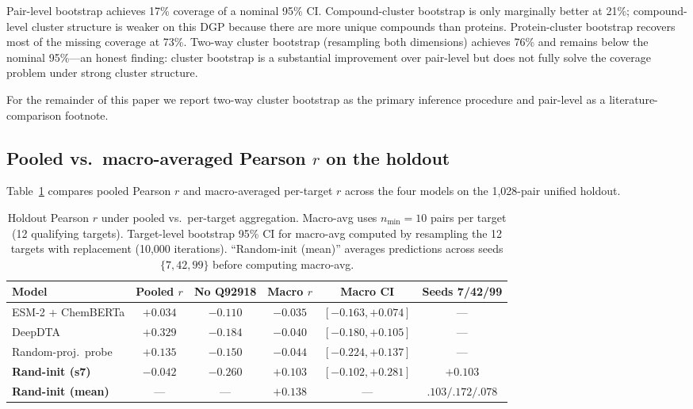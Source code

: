 \documentclass[11pt,a4paper]{article}
\begin{document}
Pair-level bootstrap achieves 17\% coverage of a nominal 95\% CI.
Compound-cluster bootstrap is only marginally better at 21\%; compound-level
cluster structure is weaker on this DGP because there are more unique compounds
than proteins.
Protein-cluster bootstrap recovers most of the missing coverage at 73\%.
Two-way cluster bootstrap (resampling both dimensions) achieves 76\% and remains
below the nominal 95\%---an honest finding: cluster bootstrap is a substantial
improvement over pair-level but does not fully solve the coverage problem under
strong cluster structure.

For the remainder of this paper we report two-way cluster bootstrap as the
primary inference procedure and pair-level as a literature-comparison footnote.

\subsection{Pooled vs.\ macro-averaged Pearson $r$ on the holdout}

Table~\ref{tab:pooled-vs-macro} compares pooled Pearson $r$ and macro-averaged
per-target $r$ across the four models on the 1{,}028-pair unified holdout.

\begin{table}[h]
\centering
\caption{Holdout Pearson $r$ under pooled vs.\ per-target aggregation. Macro-avg
uses $n_\text{min} = 10$ pairs per target (12 qualifying targets). Target-level
bootstrap 95\% CI for macro-avg computed by resampling the 12 targets with
replacement (10{,}000 iterations). ``Random-init (mean)'' averages predictions
across seeds $\{7, 42, 99\}$ before computing macro-avg.}
\label{tab:pooled-vs-macro}
\small
\begin{tabular}{lccccc}
\toprule
\small\textbf{Model} & \textbf{Pooled $r$} & \textbf{No Q92918} & \textbf{Macro $r$} & \textbf{Macro CI} & \textbf{Seeds 7/42/99} \\
\midrule
ESM-2 + ChemBERTa    & $+0.034$ & $-0.110$ & $-0.035$ & $[-0.163, +0.074]$ & --- \\
DeepDTA              & $+0.329$ & $-0.184$ & $-0.040$ & $[-0.180, +0.105]$ & --- \\
Random-proj.\ probe  & $+0.135$ & $-0.150$ & $-0.044$ & $[-0.224, +0.137]$ & --- \\
\textbf{Rand-init (s7)} & $-0.042$ & $-0.260$ & $\mathbf{+0.103}$ & $[-0.102, +0.281]$ & $+0.103$ \\
\textbf{Rand-init (mean)} & --- & --- & $\mathbf{+0.138}$ & --- & $.103/.172/.078$ \\
\bottomrule
\end{tabular}
\end{table}
\end{document}
